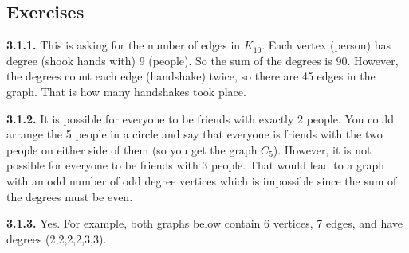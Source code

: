 \documentclass[10pt,]{book}
\theoremstyle{plain}
\theoremstyle{definition}
\theoremstyle{definition}
\theoremstyle{definition}
\theoremstyle{definition}
\numberwithin{equation}{chapter}
\begin{document}
\subsection*{ Exercises}
\noindent\textbf{3.1.1.} \hypertarget{p-1553}{}%
This is asking for the number of edges in \(K_{10}\). Each vertex (person) has degree (shook hands with) 9 (people). So the sum of the degrees is \(90\). However, the degrees count each edge (handshake) twice, so there are 45 edges in the graph. That is how many handshakes took place.%
\par\smallskip
\noindent\textbf{3.1.2.} \hypertarget{p-1555}{}%
It is possible for everyone to be friends with exactly 2 people. You could arrange the 5 people in a circle and say that everyone is friends with the two people on either side of them (so you get the graph \(C_5\)). However, it is not possible for everyone to be friends with 3 people. That would lead to a graph with an odd number of odd degree vertices which is impossible since the sum of the degrees must be even.%
\par\smallskip
\noindent\textbf{3.1.3.} \hypertarget{p-1557}{}%
Yes. For example, both graphs below contain 6 vertices, 7 edges, and have degrees (2,2,2,2,3,3).%
\end{document}
